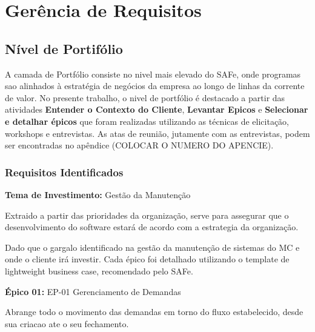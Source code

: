 \chapter[Gerência de Requisitos]{Gerência de Requisitos}

\section{Nível de Portifólio}

A camada de Portfólio consiste no nivel mais elevado do SAFe, onde programas sao alinhados à
estratégia de negócios da empresa ao longo de linhas da corrente de valor. No presente trabalho,
o nivel de portfólio é destacado a partir das atividades \textbf{Entender o Contexto do Cliente},
\textbf{Levantar Epicos} e \textbf{Selecionar e detalhar épicos} que foram realizadas utilizando as
técnicas de elicitação, workshops e entrevistas. As atas de reunião, jutamente com as entrevistas,
podem ser encontradas no apêndice (COLOCAR O NUMERO DO APENCIE).

\subsection{Requisitos Identificados}

\textbf{Tema de Investimento:} Gestão da Manutenção

Extraido a partir das prioridades da organização, serve para assegurar que o desenvolvimento
do software estará de acordo com a estrategia da organização.

Dado que o gargalo identificado na gestão da manutenção de sistemas do MC e onde o cliente irá investir.
Cada épico foi detalhado utilizando o template de lightweight business case, recomendado pelo SAFe. \cite{scaleP}

\textbf{Épico 01:} EP-01 Gerenciamento de Demandas

Abrange todo o movimento das demandas em torno do fluxo estabelecido, desde sua criacao ate o seu fechamento.

